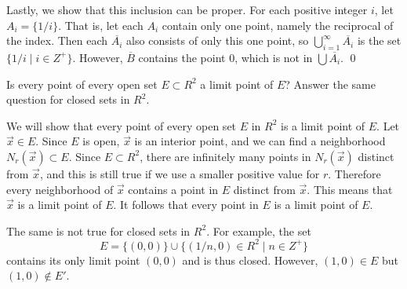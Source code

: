\begin{solution}
\begin{enumerate}
    Lastly, we show that this inclusion can be proper. For each
    positive integer $i$, let $A_i = \{1 / i\}$. That is, let each
    $A_i$ contain only one point, namely the reciprocal of the
    index. Then each $\overline{A_i}$ also consists of only this one
    point, so $\bigcup_{i=1}^\infty\overline{A_i}$ is the set
    $\{1/i \mid i\in Z^+\}$. However, $\overline{B}$ contains the
    point $0$, which is not in $\bigcup\overline{A_i}$. \qed
  \end{enumerate}
\end{solution}

 Is every point of every open set $E\subset R^2$ a limit
point of $E$? Answer the same question for closed sets in $R^2$.
\begin{solution}
  We will show that every point of every open set $E$ in $R^2$ is a
  limit point of $E$. Let $\vec{x}\in E$. Since $E$ is open, $\vec{x}$
  is an interior point, and we can find a neighborhood
  $N_r(\vec{x})\subset E$. Since $E\subset R^2$, there are infinitely
  many points in $N_r(\vec{x})$ distinct from $\vec{x}$, and this is
  still true if we use a smaller positive value for $r$. Therefore
  every neighborhood of $\vec{x}$ contains a point in $E$ distinct
  from $\vec{x}$. This means that $\vec{x}$ is a limit point of
  $E$. It follows that every point in $E$ is a limit point of $E$.

  The same is not true for closed sets in $R^2$. For example, the set
  \begin{equation*}
    E = \{(0,0)\}\cup\{(1/n,0)\in R^2\mid n\in Z^+\}
  \end{equation*}
  contains its only limit point $(0,0)$ and is thus closed. However,
  $(1, 0)\in E$ but $(1,0)\not\in E'$.
\end{solution}

